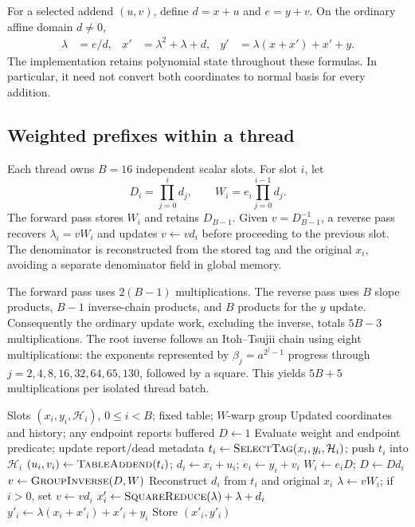 \documentclass[11pt,a4paper]{article}
\begin{document}
For a selected addend $(u,v)$, define $d=x+u$ and $e=y+v$. On the ordinary affine domain $d\ne0$,
\begin{align}\label{eq:affine}
 \lambda&=e/d,&
 x'&=\lambda^2+\lambda+d,&
 y'&=\lambda(x+x')+x'+y.
\end{align}
The implementation retains polynomial state throughout these formulas. In particular, it need not convert both coordinates to normal basis for every addition.

\subsection{Weighted prefixes within a thread}
Each thread owns $B=16$ independent scalar slots. For slot $i$, let
\begin{equation}
 D_i=\prod_{j=0}^{i}d_j,\qquad W_i=e_i\prod_{j=0}^{i-1}d_j.
\end{equation}
The forward pass stores $W_i$ and retains $D_{B-1}$. Given $v=D_{B-1}^{-1}$, a reverse pass recovers $\lambda_i=vW_i$ and updates $v\leftarrow vd_i$ before proceeding to the previous slot. The denominator is reconstructed from the stored tag and the original $x_i$, avoiding a separate denominator field in global memory.

The forward pass uses $2(B-1)$ multiplications. The reverse pass uses $B$ slope products, $B-1$ inverse-chain products, and $B$ products for the $y$ update. Consequently the ordinary update work, excluding the inverse, totals $5B-3$ multiplications. The root inverse follows an Itoh--Tsujii chain using eight multiplications: the exponents represented by $\beta_j=a^{2^j-1}$ progress through $j=2,4,8,16,32,64,65,130$, followed by a square. This yields $5B+5$ multiplications per isolated thread batch.

\begin{algorithm}[t]
\caption{One scheduled batch step, ordinary nonzero-denominator domain}
\label{alg:batch}
\begin{algorithmic}[1]
\Require Slots $(x_i,y_i,\mathcal H_i)$, $0\leq i<B$; fixed table; $W$-warp group
\Ensure Updated coordinates and history; any endpoint reports buffered
\State $D\gets1$
  \State Evaluate weight and endpoint predicate; update report/dead metadata
  \State $t_i\gets\Call{SelectTag}{x_i,y_i,\mathcal H_i}$; push $t_i$ into $\mathcal H_i$
  \State $(u_i,v_i)\gets\Call{TableAddend}{t_i}$; $d_i\gets x_i+u_i$; $e_i\gets y_i+v_i$
  \State $W_i\gets e_i D$; $D\gets Dd_i$ 
\EndFor
\State $v\gets\Call{GroupInverse}{D,W}$ 
  \State Reconstruct $d_i$ from $t_i$ and original $x_i$
  \State $\lambda\gets vW_i$; if $i>0$, set $v\gets vd_i$
  \State $x'_i\gets\Call{SquareReduce}{\lambda}+\lambda+d_i$
  \State $y'_i\gets\lambda(x_i+x'_i)+x'_i+y_i$
  \State Store $(x'_i,y'_i)$
\EndFor
\end{algorithmic}
\end{algorithm}
\end{document}
